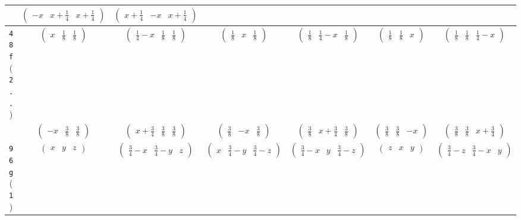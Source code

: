 \documentclass[fleqn,9pt,landscape]{jsarticle}
\begin{document}
\begin{center}
\begin{longtable}{ccccccc}
& $ \begin{pmatrix} - x & x + \frac{1}{4} & x + \frac{1}{4} \end{pmatrix} $ & $ \begin{pmatrix} x + \frac{1}{4} & - x & x + \frac{1}{4} \end{pmatrix} $ & $  $ & $  $ & $  $ & $  $ \\ \hline
{\tt 48f} ({\tt 2..}) & $ \begin{pmatrix} x & \frac{1}{8} & \frac{1}{8} \end{pmatrix} $ & $ \begin{pmatrix} \frac{1}{4} - x & \frac{1}{8} & \frac{1}{8} \end{pmatrix} $ & $ \begin{pmatrix} \frac{1}{8} & x & \frac{1}{8} \end{pmatrix} $ & $ \begin{pmatrix} \frac{1}{8} & \frac{1}{4} - x & \frac{1}{8} \end{pmatrix} $ & $ \begin{pmatrix} \frac{1}{8} & \frac{1}{8} & x \end{pmatrix} $ & $ \begin{pmatrix} \frac{1}{8} & \frac{1}{8} & \frac{1}{4} - x \end{pmatrix} $ \\
& $ \begin{pmatrix} - x & \frac{3}{8} & \frac{3}{8} \end{pmatrix} $ & $ \begin{pmatrix} x + \frac{3}{4} & \frac{3}{8} & \frac{3}{8} \end{pmatrix} $ & $ \begin{pmatrix} \frac{3}{8} & - x & \frac{3}{8} \end{pmatrix} $ & $ \begin{pmatrix} \frac{3}{8} & x + \frac{3}{4} & \frac{3}{8} \end{pmatrix} $ & $ \begin{pmatrix} \frac{3}{8} & \frac{3}{8} & - x \end{pmatrix} $ & $ \begin{pmatrix} \frac{3}{8} & \frac{3}{8} & x + \frac{3}{4} \end{pmatrix} $ \\ \hline
{\tt 96g} ({\tt 1}) & $ \begin{pmatrix} x & y & z \end{pmatrix} $ & $ \begin{pmatrix} \frac{3}{4} - x & \frac{3}{4} - y & z \end{pmatrix} $ & $ \begin{pmatrix} x & \frac{3}{4} - y & \frac{3}{4} - z \end{pmatrix} $ & $ \begin{pmatrix} \frac{3}{4} - x & y & \frac{3}{4} - z \end{pmatrix} $ & $ \begin{pmatrix} z & x & y \end{pmatrix} $ & $ \begin{pmatrix} \frac{3}{4} - z & \frac{3}{4} - x & y \end{pmatrix} $ \\

\end{longtable}
\end{center}
\end{document}
